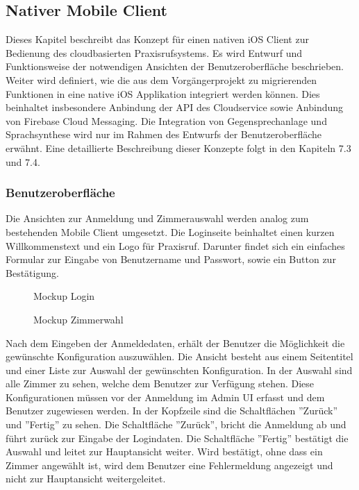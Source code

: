 \subsection{Nativer Mobile Client}

Dieses Kapitel beschreibt das Konzept für einen nativen iOS Client zur Bedienung des cloudbasierten Praxisrufsystems.
Es wird Entwurf und Funktionsweise der notwendigen Ansichten der Benutzeroberfläche beschrieben.
Weiter wird definiert, wie die aus dem Vorgängerprojekt zu migrierenden Funktionen in eine native iOS Applikation integriert werden können.
Dies beinhaltet insbesondere Anbindung der API des Cloudservice sowie Anbindung von Firebase Cloud Messaging.
Die Integration von Gegensprechanlage und Sprachsynthese wird nur im Rahmen des Entwurfs der Benutzeroberfläche erwähnt.
Eine detaillierte Beschreibung dieser Konzepte folgt in den Kapiteln 7.3 und 7.4.


\subsubsection{Benutzeroberfläche}

Die Ansichten zur Anmeldung und Zimmerauswahl werden analog zum bestehenden Mobile Client umgesetzt.
Die Loginseite beinhaltet einen kurzen Willkommenstext und ein Logo für Praxisruf.
Darunter findet sich ein einfaches Formular zur Eingabe von Benutzername und Passwort, sowie ein Button zur Bestätigung.

\begin{figure}[h]
    \centering
    \begin{minipage}[b]{0.4\textwidth}
        \caption{Mockup Login}
    \end{minipage}
    \hfill
    \begin{minipage}[b]{0.4\textwidth}
        \caption{Mockup Zimmerwahl}
    \end{minipage}\label{fig:Mockups-Login-ClientSelection}
\end{figure}

Nach dem Eingeben der Anmeldedaten, erhält der Benutzer die Möglichkeit die gewünschte Konfiguration auszuwählen.
Die Ansicht besteht aus einem Seitentitel und einer Liste zur Auswahl der gewünschten Konfiguration.
In der Auswahl sind alle Zimmer zu sehen, welche dem Benutzer zur Verfügung stehen.
Diese Konfigurationen müssen vor der Anmeldung im Admin UI erfasst und dem Benutzer zugewiesen werden.
In der Kopfzeile sind die Schaltflächen ''Zurück'' und ''Fertig'' zu sehen.
Die Schaltfläche ''Zurück'', bricht die Anmeldung ab und führt zurück zur Eingabe der Logindaten.
Die Schaltfläche ''Fertig'' bestätigt die Auswahl und leitet zur Hauptansicht weiter.
Wird bestätigt, ohne dass ein Zimmer angewählt ist, wird dem Benutzer eine Fehlermeldung angezeigt und nicht zur Hauptansicht weitergeleitet.

